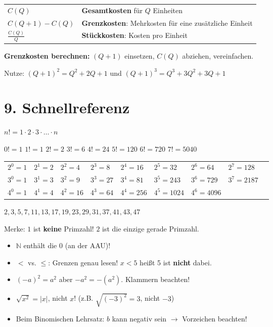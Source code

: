 \documentclass[10pt, a4paper]{article}
\begin{document}
\begin{defbox}[Grundbegriffe]
\begin{tabular}{ll}
    $C(Q)$ & \textbf{Gesamtkosten} f\"ur $Q$ Einheiten \\
    $C(Q+1) - C(Q)$ & \textbf{Grenzkosten}: Mehrkosten f\"ur eine zus\"atzliche Einheit \\
    $\frac{C(Q)}{Q}$ & \textbf{St\"uckkosten}: Kosten pro Einheit
\end{tabular}

\textbf{Grenzkosten berechnen:} $(Q+1)$ einsetzen, $C(Q)$ abziehen, vereinfachen.

Nutze: $(Q+1)^2 = Q^2 + 2Q + 1$ und $(Q+1)^3 = Q^3 + 3Q^2 + 3Q + 1$
\end{defbox}

\section*{9. Schnellreferenz}

\begin{tipbox}[Fakult\"at $n!$]
$n! = 1 \cdot 2 \cdot 3 \cdot \ldots \cdot n$

$0! = 1$ \quad $1! = 1$ \quad $2! = 2$ \quad $3! = 6$ \quad $4! = 24$ \quad $5! = 120$ \quad $6! = 720$ \quad $7! = 5040$
\end{tipbox}

\begin{tipbox}[Potenzen]
\renewcommand{\arraystretch}{1.2}
\begin{tabular}{lllllllll}
    $2^0=1$ & $2^1=2$ & $2^2=4$ & $2^3=8$ & $2^4=16$ & $2^5=32$ & $2^6=64$ & $2^7=128$ \\
    $3^0=1$ & $3^1=3$ & $3^2=9$ & $3^3=27$ & $3^4=81$ & $3^5=243$ & $3^6=729$ & $3^7=2187$ \\
    $4^0=1$ & $4^1=4$ & $4^2=16$ & $4^3=64$ & $4^4=256$ & $4^5=1024$ & $4^6=4096$ &
\end{tabular}
\end{tipbox}

\begin{tipbox}
$2, 3, 5, 7, 11, 13, 17, 19, 23, 29, 31, 37, 41, 43, 47$

Merke: $1$ ist \textbf{keine} Primzahl! $2$ ist die einzige gerade Primzahl.
\end{tipbox}

\begin{warnbox}
\begin{itemize}
    \item $\mathbb{N}$ enth\"alt die $0$ (an der AAU)!
    \item $<$ vs. $\leq$: Grenzen genau lesen! $x < 5$ hei\ss{}t 5 ist \textbf{nicht} dabei.
    \item $(-a)^2 = a^2$ aber $-a^2 = -(a^2)$. Klammern beachten!
    \item $\sqrt{x^2} = |x|$, nicht $x$! (z.B. $\sqrt{(-3)^2} = 3$, nicht $-3$)
    \item Beim Binomischen Lehrsatz: $b$ kann negativ sein $\rightarrow$ Vorzeichen beachten!
\end{itemize}
\end{warnbox}
\end{document}
